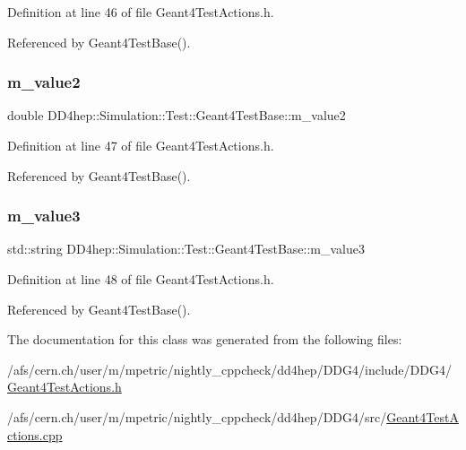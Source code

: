 Definition at line 46 of file Geant4\+Test\+Actions.\+h.



Referenced by Geant4\+Test\+Base().

\hypertarget{class_d_d4hep_1_1_simulation_1_1_test_1_1_geant4_test_base_a782a7fd9a4c6920190976bfc7220c53e}{}\label{class_d_d4hep_1_1_simulation_1_1_test_1_1_geant4_test_base_a782a7fd9a4c6920190976bfc7220c53e} 
\subsubsection{\texorpdfstring{m\+\_\+value2}{m\_value2}}
{\footnotesize\ttfamily double D\+D4hep\+::\+Simulation\+::\+Test\+::\+Geant4\+Test\+Base\+::m\+\_\+value2\hspace{0.3cm}{\ttfamily [protected]}}



Definition at line 47 of file Geant4\+Test\+Actions.\+h.



Referenced by Geant4\+Test\+Base().

\hypertarget{class_d_d4hep_1_1_simulation_1_1_test_1_1_geant4_test_base_a47f59388ee7476f251564abf651de4b5}{}\label{class_d_d4hep_1_1_simulation_1_1_test_1_1_geant4_test_base_a47f59388ee7476f251564abf651de4b5} 
\subsubsection{\texorpdfstring{m\+\_\+value3}{m\_value3}}
{\footnotesize\ttfamily std\+::string D\+D4hep\+::\+Simulation\+::\+Test\+::\+Geant4\+Test\+Base\+::m\+\_\+value3\hspace{0.3cm}{\ttfamily [protected]}}



Definition at line 48 of file Geant4\+Test\+Actions.\+h.



Referenced by Geant4\+Test\+Base().



The documentation for this class was generated from the following files\+:\begin{DoxyCompactItemize}
\item 
/afs/cern.\+ch/user/m/mpetric/nightly\+\_\+cppcheck/dd4hep/\+D\+D\+G4/include/\+D\+D\+G4/\hyperlink{_geant4_test_actions_8h}{Geant4\+Test\+Actions.\+h}\item 
/afs/cern.\+ch/user/m/mpetric/nightly\+\_\+cppcheck/dd4hep/\+D\+D\+G4/src/\hyperlink{_geant4_test_actions_8cpp}{Geant4\+Test\+Actions.\+cpp}\end{DoxyCompactItemize}
